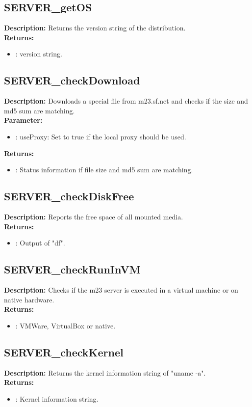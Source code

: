 \subsection{SERVER\_getOS}
\textbf{Description:} Returns the version string of the distribution.\\
\textbf{Returns:}
\begin{itemize}
\item : version string.
\end{itemize}

\subsection{SERVER\_checkDownload}
\textbf{Description:} Downloads a special file from m23.sf.net and checks if the size and md5 sum are matching.\\
\textbf{Parameter:}
\begin{itemize}
\item : useProxy: Set to true if the local proxy should be used.
\end{itemize}
\textbf{Returns:}
\begin{itemize}
\item : Status information if file size and md5 sum are matching.
\end{itemize}

\subsection{SERVER\_checkDiskFree}
\textbf{Description:} Reports the free space of all mounted media.\\
\textbf{Returns:}
\begin{itemize}
\item : Output of "df".
\end{itemize}

\subsection{SERVER\_checkRunInVM}
\textbf{Description:} Checks if the m23 server is executed in a virtual machine or on native hardware.\\
\textbf{Returns:}
\begin{itemize}
\item : VMWare, VirtualBox or native.
\end{itemize}

\subsection{SERVER\_checkKernel}
\textbf{Description:} Returns the kernel information string of "uname -a".\\
\textbf{Returns:}
\begin{itemize}
\item : Kernel information string.
\end{itemize}

